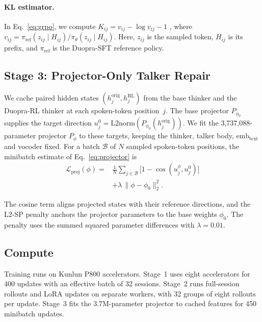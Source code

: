 \paragraph{KL estimator.}
In Eq.~\eqref{eq:grpo}, we compute $K_{ij}=v_{ij}-\log v_{ij}-1$
\citep{shao2024deepseekmath}, where
$v_{ij}=\pi_{\mathrm{ref}}(z_{ij}\mid H_{ij})/
\pi_\theta(z_{ij}\mid H_{ij})$.
Here, $z_{ij}$ is the sampled token, $H_{ij}$ is its prefix, and
$\pi_{\mathrm{ref}}$ is the Duopra-SFT reference policy.

\subsection{Stage 3: Projector-Only Talker Repair}
We cache paired hidden states $(h_j^{\mathrm{orig}},h_j^{\mathrm{RL}})$ from the base thinker and the Duopra-RL thinker at each spoken-token position~$j$.
The base projector $P_{\phi_0}$ supplies the target direction
$u_j^0=\mathrm{L2norm}(P_{\phi_0}(h_j^{\mathrm{orig}}))$.
We fit the 3,737,088-parameter projector $P_\phi$ to these targets, keeping the thinker, talker body, $\mathrm{emb}_{\mathrm{text}}$ and vocoder fixed.
For a batch $\mathcal B$ of $N$ sampled spoken-token positions, the minibatch estimate of Eq.~\eqref{eq:projector} is
\begin{equation}
\begin{split}
\mathcal{L}_{\mathrm{proj}}(\phi)={}&\frac{1}{N}\sum_{j\in\mathcal B}
 \big[1-\cos(u_j^\phi,u_j^0)\big]\\
&+\lambda\,\lVert\phi-\phi_0\rVert_2^2.
\end{split}
\label{eq:projector-minibatch}
\end{equation}

The cosine term aligns projected states with their reference directions, and the L2-SP penalty \citep{li2018explicit} anchors the projector parameters to the base weights $\phi_0$.
The penalty uses the summed squared parameter differences with $\lambda=0.01$.



\subsection{Compute}
\label{app:compute}
Training runs on Kunlun P800 accelerators.
Stage~1 uses eight accelerators for 400 updates with an effective batch of 32 sessions.
Stage~2 runs full-session rollouts and LoRA updates on separate workers, with 32 groups of eight rollouts per update.
Stage~3 fits the 3.7M-parameter projector to cached features for 450 minibatch updates.

